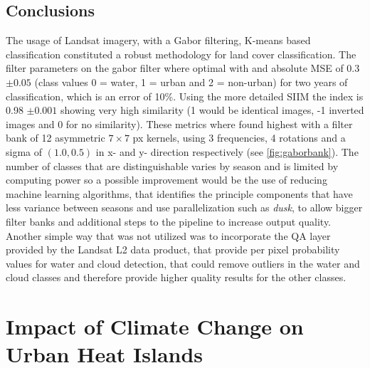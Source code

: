 \documentclass[12pt,a4paper, english,twoside]{article}
\begin{document}
 \subsection{Conclusions}
    The usage of Landsat imagery, with a Gabor filtering, K-means based classification constituted a robust methodology for land cover classification.
    The filter parameters on the gabor filter where optimal with and absolute MSE of 0.3 $\pm 0.05$ (class values 0 = water, 1 = urban and 2 = non-urban) for two years of classification, which is an error of 10\%.
    Using the more detailed \gls{SIIM} the index is 0.98 $\pm 0.001$ showing very high similarity (1 would be identical images, -1 inverted images and 0 for no similarity). 
    These metrics where found highest with a filter bank of 12 asymmetric $7\times7$ px kernels, using 3 frequencies, 4 rotations and a sigma of $(1.0,0.5)$ in x- and y- direction respectively (see \cref{fig:gaborbank}).
    \todo[inline,size=\tiny]{}
    The number of classes that are distinguishable varies by season and is limited by computing power so a possible improvement would be the use of reducing machine learning algorithms, that identifies the principle components that have less variance between seasons and use parallelization such as \textit{dusk}\autocite{dusk}, to allow bigger filter banks and additional steps to the pipeline to increase output quality.
    Another simple way that was not utilized was to incorporate the QA layer provided by the Landsat L2 data product, that provide per pixel probability values for water and cloud detection, that could remove outliers in the water and cloud classes and therefore provide higher quality results for the other classes. 
%
  \newpage
  \section{Impact of Climate Change on Urban Heat Islands}\label{sec:UHITempImp}
\end{document}
